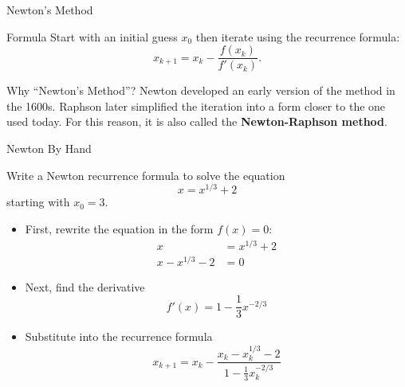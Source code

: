 \documentclass[10pt]{beamer}
\begin{document}
\begin{frame}[fragile]{Newton's Method}


    \begin{block}{Formula}
    Start with an initial guess $x_0$ then iterate using the recurrence formula:
    \begin{equation*}
            x_{k+1} = x_k - \frac{f(x_k)}{f'(x_k)}.
\end{equation*}

    \end{block}

{
}


\medskip
{
\begin{block}{Why ``Newton's Method''?}
Newton developed an early version of the method in the 1600s.
Raphson later simplified the iteration into a form closer to
the one used today.  For this reason, it is also called the
\textbf{Newton-Raphson method}.
\end{block}
}

\end{frame}
\begin{frame}{Newton By Hand}
\begin{example}
Write a Newton recurrence formula to solve the equation
\begin{equation*}
    x = x^{1/3} + 2 
\end{equation*}
starting with $x_0 = 3$.
\end{example}

\begin{itemize}
    \item First, rewrite the equation in the form $f(x)=0$: 
        \begin{align*}
                x &= x^{1/3} + 2\\ 
                x - x^{1/3} - 2 &=0  
        \end{align*}
\item Next, find the derivative 
\begin{equation*}
    f'(x) = 1 - \frac{1}{3}x^{-2/3}
\end{equation*}
\item Substitute into the recurrence formula 
\begin{equation*}
    x_{k+1} = x_k - \frac{x_k - x_k^{1/3} - 2}{1 - \frac{1}{3}x_k^{-2/3}}
\end{equation*}
\end{itemize}
\end{frame}
\end{document}
